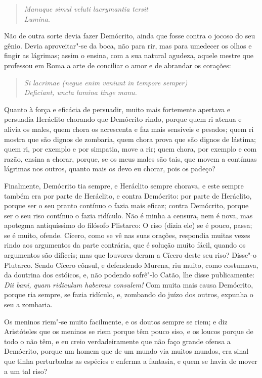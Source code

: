 \begin{verse}
\emph{Manuque simul veluti lacrymantia tersit}\\
\emph{Lumina}.
\end{verse}

Não de outra sorte devia fazer Demócrito, ainda que fosse contra o
jocoso do seu gênio. Devia aproveitar"-se da boca, não para rir, mas para
umedecer os olhos e fingir as lágrimas; assim o ensina, com a sua
natural agudeza, aquele mestre que professou em Roma a arte de conciliar
o amor e de abrandar os corações:

\begin{verse}
\emph{Si lacrimae (negue enim veniunt in tempore semper)}\\
\emph{Deficiant, uncta lumina tinge manu.}
\end{verse}

Quanto à força e eficácia de persuadir, muito mais fortemente apertava e
persuadia Heráclito chorando que Demócrito rindo, porque quem ri atenua
e alivia os males, quem chora os acrescenta e faz mais sensíveis e
pesados; quem ri mostra que são dignos de zombaria, quem chora prova que
são dignos de lástima; quem ri, por exemplo e por simpatia, move a rir;
quem chora, por exemplo e com razão, ensina a chorar, porque, se os meus
males são tais, que movem a contínuas lágrimas nos outros, quanto mais
os devo eu chorar, pois os padeço?

Finalmente, Demócrito tia sempre, e Heráclito sempre chorava, e este
sempre também era por parte de Heráclito, e contra Demócrito: por parte
de Heráclito, porque ser o seu pranto contínuo o fazia mais eficaz;
contra Demócrito, porque ser o seu riso contínuo o fazia ridículo. Não é
minha a censura, nem é nova, mas apotegma antiquíssimo do filósofo
Plistarco: O riso (dizia ele) se é pouco, passa; se é muito, ofende.
Cícero, como se vê nas suas orações, respondia muitas vezes rindo aos
argumentos da parte contrária, que é solução muito fácil, quando os
argumentos são difíceis; mas que louvores deram a Cícero deste seu riso?
Disse"-o Plutarco. Sendo Cícero cônsul, e defendendo Murena, riu muito,
como costumava, da doutrina dos estóicos, e, não podendo sofrê"-lo Catão,
lhe disse publicamente: \emph{Dii bani, quam ridiculum habemus consulem!} Com muita mais causa Demócrito, porque ria
sempre, se fazia ridículo, e, zombando do juízo dos outros, expunha o
seu a zombaria.

Os meninos riem"-se muito facilmente, e os doutos sempre se riem; e diz
Aristóteles que os meninos se riem porque têm pouco siso, e os loucos
porque de todo o não têm, e eu creio verdadeiramente que não faço grande
ofensa a Demócrito, porque um homem que de um mundo via muitos mundos,
era sinal que tinha perturbadas as espécies e enferma a fantasia, e quem
se havia de mover a um tal riso?

